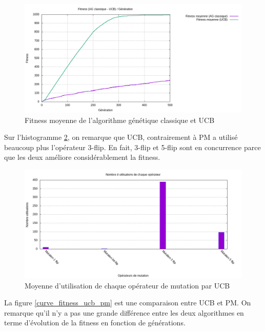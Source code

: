 \documentclass[12pt]{article}
\begin{document}
\begin{figure}[H]
	\begin{center}
		\includegraphics[scale=0.5]{img/curve_ag_ucb.png}
		\caption{Fitness moyenne de l'algorithme génétique classique et UCB}
		\label{curve_ag_ucb}
	\end{center}
\end{figure}

Sur l'histogramme \ref{histogrammeOpucb}, on remarque que UCB, contrairement à PM a utilisé beaucoup plus l'opérateur 3-flip. En fait, 3-flip et 5-flip sont en concurrence parce que les deux améliore considérablement la fitness.  

\begin{figure}[H]
	\begin{center}
		\includegraphics[scale=0.5]{img/histogrammeOpucb.png}
		\caption{Moyenne d'utilisation de chaque opérateur de mutation par UCB}
		\label{histogrammeOpucb}
	\end{center}
\end{figure}

La figure \ref{curve_fitness_ucb_pm} est une comparaison entre UCB et PM. On remarque qu'il n'y a pas une grande différence entre les deux algorithmes en terme d'évolution de la fitness en fonction de générations.
\end{document}
